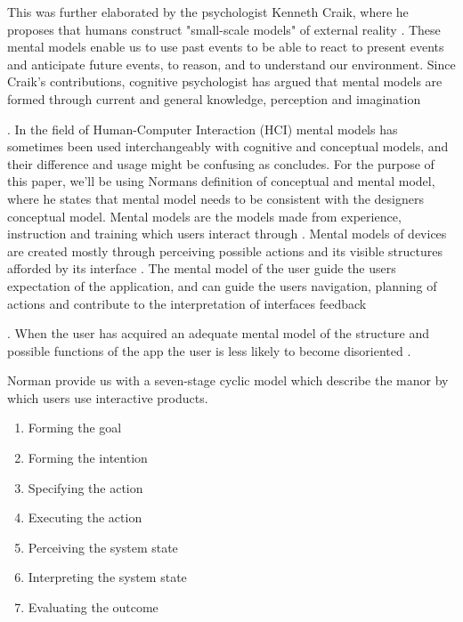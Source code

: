 \begin{enumerate}
This was further elaborated by the psychologist Kenneth Craik, where he proposes that humans construct "small-scale models" of external reality \cite{Craik1967}. These mental models enable us to use past events to be able to react to present events and anticipate future events, to reason, and to understand our environment. Since Craik's contributions, cognitive psychologist has argued that mental models are formed through current and general knowledge, perception and imagination \cite{Johnson-Laird2001} . In the field of Human-Computer Interaction (HCI) mental models has sometimes been used interchangeably with cognitive and conceptual models, and their difference and usage might be confusing as \cite{Staggers1993} concludes. For the purpose of this paper, we'll be using Normans \cite{Norman2013a} definition of conceptual and mental model, where he states that mental model needs to be consistent with the designers conceptual model. Mental models are the models made from experience, instruction and training which users interact through \cite{Norman2013a}. Mental models of devices are created mostly through perceiving possible actions and its visible structures afforded by its interface \cite{Norman2013a}. The mental model of the user guide the users expectation of the application, and can guide the users navigation, planning of actions and contribute to the interpretation of interfaces feedback \cite{Jin1992}. When the user has acquired an adequate mental model of the structure and possible functions of the app the user is less likely to become disoriented \cite{Jih1992}.

Norman \cite{Norman2013a} provide us with a seven-stage cyclic model which describe the manor by which users use interactive products.
\begin{enumerate}
  \item Forming the goal
  \item Forming the intention
  \item Specifying the action
  \item Executing the action
  \item Perceiving the system state
  \item Interpreting the system state
  \item Evaluating the outcome
\end{enumerate}


\end{enumerate}
